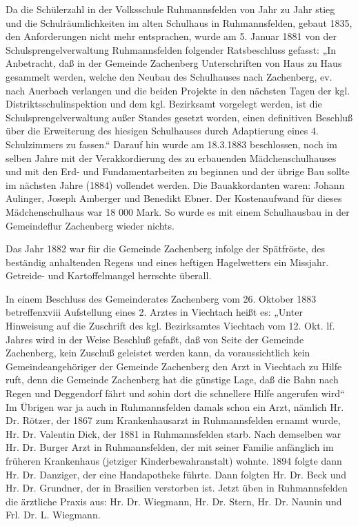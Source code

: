 \documentclass[12pt,a4pager]{book}
\begin{document}
Da die Schülerzahl in der Volksschule Ruhmannsfelden von Jahr zu Jahr stieg und
die Schulräumlichkeiten im alten Schulhaus in Ruhmannsfelden, gebaut 1835, den
Anforderungen nicht mehr entsprachen, wurde am 5. Januar 1881 von der
Schulsprengelverwaltung Ruhmannsfelden folgender Ratsbeschluss gefasst: „In
Anbetracht, daß in der Gemeinde Zachenberg Unterschriften von Haus zu Haus
gesammelt werden, welche den Neubau des Schulhauses nach Zachenberg, ev. nach
Auerbach verlangen und die beiden Projekte in den nächsten Tagen der kgl.
Distriktsschulinspektion und dem kgl. Bezirksamt vorgelegt werden, ist die
Schulsprengelverwaltung außer Standes gesetzt worden, einen definitiven Beschluß
über die Erweiterung des hiesigen Schulhauses durch Adaptierung eines 4.
Schulzimmers zu fassen.“ Darauf hin wurde am 18.3.1883 beschlossen, noch im
selben Jahre mit der Verakkordierung des zu erbauenden Mädchenschulhauses und
mit den Erd- und Fundamentarbeiten zu beginnen und der übrige Bau sollte im
nächsten Jahre (1884) vollendet werden. Die Bauakkordanten waren: Johann
Aulinger, Joseph Amberger und Benedikt Ebner. Der Kostenaufwand für dieses
Mädchenschulhaus war 18 000 Mark. So wurde es mit einem Schulhausbau in der
Gemeindeflur Zachenberg wieder nichts.

Das Jahr 1882 war für die Gemeinde Zachenberg infolge der Spätfröste, des
beständig anhaltenden Regens und eines heftigen Hagelwetters ein Missjahr.
Getreide- und Kartoffelmangel herrschte überall.

In einem Beschluss des Gemeinderates Zachenberg vom 26. Oktober 1883
betreffenxviii Aufstellung eines 2. Arztes in Viechtach heißt es: „Unter
Hinweisung auf die Zuschrift des kgl. Bezirksamtes Viechtach vom 12. Okt. lf.
Jahres wird in der Weise Beschluß gefaßt, daß von Seite der Gemeinde Zachenberg,
kein Zuschuß geleistet werden kann, da voraussichtlich kein Gemeindeangehöriger
der Gemeinde Zachenberg den Arzt in Viechtach zu Hilfe ruft, denn die Gemeinde
Zachenberg hat die günstige Lage, daß die Bahn nach Regen und Deggendorf fährt
und sohin dort die schnellere Hilfe angerufen wird“ Im Übrigen war ja auch in
Ruhmannsfelden damals schon ein Arzt, nämlich Hr. Dr. Rötzer, der 1867 zum
Krankenhausarzt in Ruhmannsfelden ernannt wurde, Hr. Dr. Valentin Dick, der 1881
in Ruhmannsfelden starb. Nach demselben war Hr. Dr. Burger Arzt in
Ruhmannsfelden, der mit seiner Familie anfänglich im früheren Krankenhaus
(jetziger Kinderbewahranstalt) wohnte. 1894 folgte dann Hr. Dr. Danziger, der
eine Handapotheke führte. Dann folgten Hr. Dr. Beck und Hr. Dr. Grundner, der in
Brasilien verstorben ist. Jetzt üben in Ruhmannsfelden die ärztliche Praxis aus:
Hr. Dr. Wiegmann, Hr. Dr. Stern, Hr. Dr. Naunin und Frl. Dr. L. Wiegmann.
\end{document}
